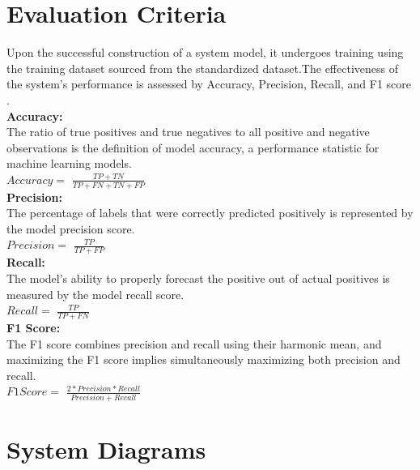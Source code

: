 \section{Evaluation Criteria}
Upon the successful construction of a system model, it undergoes training using the training dataset sourced from
the standardized dataset.The effectiveness of the system's performance is assessed by Accuracy, Precision, Recall, and F1 score
.\\
\textbf{Accuracy:}\\
The ratio of true positives and true negatives to all positive and negative observations is the definition of model accuracy, a performance statistic for machine learning models.\\
$Accuracy =$ $\frac{TP + TN}{TP + FN + TN + FP}$\\
\textbf{Precision:}\\
The percentage of labels that were correctly predicted positively is represented by the model precision score.\\
$Precision =$ $\frac{TP}{TP + FP}$\\
\textbf{Recall:}\\
The model's ability to properly forecast the positive out of actual positives is measured by the model recall score.\\
$Recall =$ $\frac{TP}{TP + FN}$\\
\textbf{F1 Score:}\\
The F1 score combines precision and recall using their harmonic mean, and maximizing the F1 score implies
simultaneously maximizing both precision and recall.\\
$F1 Score =$ $\frac{2*Precision*Recall}{Precision+Recall}$\\

\section{System Diagrams}
